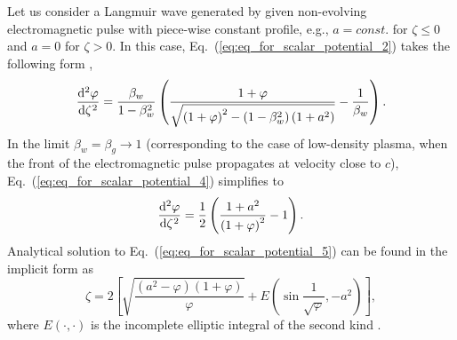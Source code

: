 \documentclass[10pt, a4paper, twoside, openright]{report}
\begin{document}
Let us consider a Langmuir wave generated by given non-evolving electromagnetic pulse with piece-wise constant profile,  e.g., $ a = const. $ for $ \zeta \leq 0 $ and $ a = 0 $ for $ \zeta > 0 $. In this case, Eq.~(\ref{eq:eq_for_scalar_potential_2}) takes the following form \cite{Bulanov2016, Bulanov2021},
\begin{equation}\label{eq:eq_for_scalar_potential_4}
\diff[2]{\varphi}{\zeta} = \frac{\beta_w}{1 - \beta_w^2} \left( \frac{1 + \varphi}{\sqrt{\left( 1 + \varphi \right)^2 - \left( 1 - \beta_w^2 \right) \left( 1 + a^2 \right)}} - \frac{1}{\beta_w} \right).
\end{equation}
In the limit $ \beta_w = \beta_g \rightarrow 1 $ (corresponding to the case of low-density plasma, when the front of the electromagnetic pulse propagates at velocity close to $ c $), Eq.~(\ref{eq:eq_for_scalar_potential_4}) simplifies to \cite{Bulanov1989, Berezhiani1990, Esarey2009, Bulanov2016, Bulanov2021}
\begin{equation}\label{eq:eq_for_scalar_potential_5}
\diff[2]{\varphi}{\zeta} = \frac{1}{2} \left( \frac{1 + a^2}{\left( 1 + \varphi \right)^2} - 1 \right).
\end{equation}
Analytical solution to Eq.~(\ref{eq:eq_for_scalar_potential_5}) can be found in the implicit form as \cite{Bulanov1989, Berezhiani1990, Bulanov2016, Bulanov2021}
\begin{equation}\label{eq:analytical_solution}
\zeta = 2 \left[ \sqrt{\frac{\left( a^2 - \varphi \right) \left( 1 + \varphi \right)}{\varphi}} + E \left( \sin \frac{1}{\sqrt{\varphi}}, -a^2 \right) \right],
\end{equation}
where $ E \left( \cdot, \cdot \right) $ is the incomplete elliptic integral of the second kind \cite{Gradshteyn1965}. 
\end{document}
